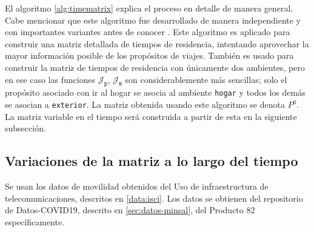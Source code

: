 El algoritmo \ref{alg:timematrix} explica el proceso en detalle de manera general. Cabe mencionar que este algoritmo fue desarrollado de manera independiente y con importantes variantes antes de conocer \cite{Munizaga2011}. Este algoritmo es aplicado para construir una matriz detallada de tiempos de residencia, intentando aprovechar la mayor información posible de los propósitos de viajes. También es usado para construir la matriz de tiempos de residencia con únicamente dos ambientes, pero en ese caso las funciones \(\mathcal{J}_{\mathtt{p}}\), \(\mathcal{J}_{\mathtt{m}}\) son considerablemente más sencillas; solo el propósito asociado con ir al hogar se asocia al ambiente \texttt{hogar} y todos los demás se asocian a \texttt{exterior}. La matriz obtenida usando este algoritmo se denota \(P^0\). La matriz variable en el tiempo será construida a partir de esta en la siguiente subsección. 




\subsection{Variaciones de la matriz a lo largo del tiempo} \label{subsec:variaciones}

Se usan los datos de movilidad obtenidos del Uso de infraestructura de telecomunicaciones, descritos en \ref{data:isci}. Los datos se obtienen del repositorio de Datos-COVID19, descrito en \ref{sec:datos-minsal}, del Producto 82 específicamente. 


